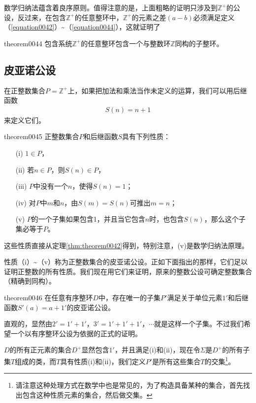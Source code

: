 数学归纳法蕴含着良序原则。值得注意的是，上面粗略的证明只涉及到$\mathbb{Z}^+$的公设，反过来，在包含$\mathbb{Z}^+$的任意整环中，$\mathbb{Z}^+$的元素之差$(a-b)$必须满足定义（\ref{equation0042}）\textasciitilde（\ref{equation0044}），这就证明了
\begin{theorem}{}{theorem0044}
包含系统$\mathbb{Z}^+$的任意整环包含一个与整数环$\mathbb{Z}$同构的子整环。
\end{theorem}

\subsection{皮亚诺公设}
在正整数集合$P=\mathbb{Z}^+$上，如果把加法和乘法当作未定义的运算，我们可以用后继函数
\begin{gather}\label{equation0045}
S(n)=n+1
\end{gather}
来定义它们。

\begin{theorem}{}{theorem0045}
正整数集合$P$和后继函数$S$具有下列性质：
\begin{enumerate}
\item[(i)] $1 \in P$，
\item[(ii)] 若$n \in P$，则$S(n) \in P$，
\item[(iii)] $P$中没有一个$n$，使得$S(n)=1$；
\item[(iv)] 对$P$中$m$和$n$，由$S(m)=S(n)$可推出$m=n$；
\item[(v)] $P$的一个子集如果包含1，并且当它包含$n$时，也包含$S(n)$，那么这个子集必等于$P$。
\end{enumerate}
\end{theorem}

这些性质直接从定理\ref{thm:theorem0042}得到，特别注意，(v)是数学归纳法原理。

性质（i）\textasciitilde（v）称为正整数集合的皮亚诺公设。正如下面指出的那样，它们足以证明正整数的所有性质。我们现在用它们来证明，原来的整数公设可确定整数集合（精确到同构）。

\begin{theorem}{}{theorem0046}
在任意有序整环$D$中，存在唯一的子集$P'$满足关于单位元素$1'$和后继函数$S'(a)=a+1'$的皮亚诺公设。
\end{theorem}

直观的，显然由$2'=1'+1'$，$3'=1'+1'+1'$，$\cdots$就是这样一个子集。不过我们希望一个以有序整环公设为依据的正式的证明。

$D$的所有正元素的集合$D^+$显然包含$1'$，并且满足(i)和(ii)，现在令$\Sigma$是$D^+$的所有子集$T$组成的类，而$T$具有性质(i)和(ii)，我们定义$P'$是所有这些集合$T$的交集\footnote{请注意这种处理方式在数学中也是常见的，为了构造具备某种的集合，首先找出包含这种性质元素的集合，然后做交集。}。


